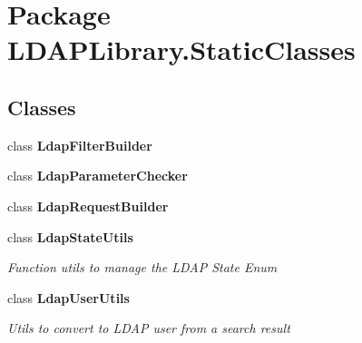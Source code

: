 \hypertarget{namespace_l_d_a_p_library_1_1_static_classes}{}\section{Package L\+D\+A\+P\+Library.\+Static\+Classes}
\label{namespace_l_d_a_p_library_1_1_static_classes}
\subsection*{Classes}
\begin{DoxyCompactItemize}
\item 
class {\bfseries Ldap\+Filter\+Builder}
\item 
class {\bfseries Ldap\+Parameter\+Checker}
\item 
class {\bfseries Ldap\+Request\+Builder}
\item 
class {\bfseries Ldap\+State\+Utils}
\begin{DoxyCompactList}\small\item\em Function utils to manage the L\+D\+A\+P State Enum \end{DoxyCompactList}\item 
class {\bfseries Ldap\+User\+Utils}
\begin{DoxyCompactList}\small\item\em Utils to convert to L\+D\+A\+P user from a search result \end{DoxyCompactList}\end{DoxyCompactItemize}
